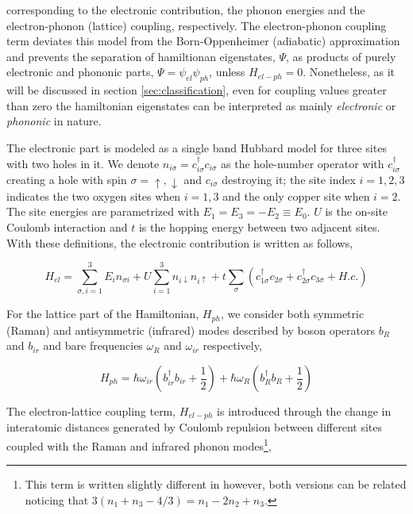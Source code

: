 \noindent corresponding to the electronic contribution, the phonon energies and the electron-phonon (lattice) coupling, respectively. 
The electron-phonon coupling term deviates this model from the Born-Oppenheimer (adiabatic) approximation and prevents the separation of hamiltionan eigenstates, $\Psi$, as products of purely electronic and phononic parts, $\Psi=\psi_{el}\psi_{ph}$, unless $H_{el-ph}=0$.
Nonetheless, as it will be discussed in section \ref{sec:classification}, even for coupling values greater than zero the hamiltonian eigenstates can be interpreted as mainly \textit{electronic} or \textit{phononic} in nature.

The electronic part is modeled as a single band Hubbard model for three sites with two holes in it. 
We denote $n_{i\sigma}=c_{i\sigma}^\dagger c_{i\sigma}$ as the hole-number operator with $c_{i\sigma}^\dagger$ creating a hole with spin $\sigma = \uparrow, \downarrow$ and $c_{i\sigma}$ destroying it; the site index $i=1,2,3$ indicates the two oxygen sites when  $i=1,3$ and the only copper site when $i=2$. 
The site energies are parametrized with $E_1=E_3=-E_2 \equiv E_0$. 
$U$ is the on-site Coulomb interaction and $t$ is the hopping energy between two adjacent sites. 
With these definitions, the electronic contribution is written as follows,

\begin{equation}
  \label{eq:electronic-part}
  H_{el} = \sum_{\sigma,i=1}^3 E_i n_{\sigma i} 
        + U\sum_{i=1}^3 n_{i\downarrow}n_{i\uparrow} 
        + t\sum_{\sigma} \left(c_{1\sigma}^\dagger c_{2\sigma} + c_{2\sigma}^\dagger c_{3\sigma} + H.c. \right)
\end{equation}

For the lattice  part of the Hamiltonian, $H_{ph}$, we consider both symmetric (Raman) and antisymmetric (infrared) modes described by boson operators $b_R$ and $b_{ir}$ and bare frequencies $\omega_R$ and $\omega_{ir}$ respectively,
 
\begin{equation}
 \label{eq:phonon-part}
 H_{ph} = \hbar \omega_{ir}\left(b_{ir}^\dagger b_{ir}+\frac{1}{2}\right) + \hbar \omega_R \left( b_R^\dagger b_R + \frac{1}{2}\right)
\end{equation}

 
The electron-lattice coupling term, $H_{el-ph}$ is introduced through the change in interatomic distances generated by Coulomb repulsion between different sites coupled with the Raman and infrared phonon modes\footnote{This term is written slightly different in \cite{MustredeLeon1992} however, both versions can be related noticing that $3 (n_1+n_3-4/3)=n_1-2n_2+n_3$.},
 
